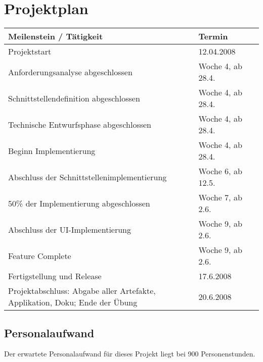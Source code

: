 

\section{Projektplan}
\begin{tabular}{ | p{11.2cm} | p{4cm} | l | }
\hline
\textbf{Meilenstein / Tätigkeit} & \textbf{Termin} \\
\hline
Projektstart & 12.04.2008\\
\hline
Anforderungsanalyse abgeschlossen & Woche 4, ab 28.4.\\
\hline
Schnittstellendefinition abgeschlossen  & Woche 4, ab 28.4.\\
\hline
Technische Entwurfsphase abgeschlossen & Woche 4, ab 28.4.\\
\hline
Beginn Implementierung & Woche 4, ab 28.4.\\
\hline
Abschluss der Schnittstellenimplementierung & Woche 6, ab 12.5.\\
\hline
50\% der Implementierung abgeschlossen & Woche 7, ab 2.6. \\
\hline 
Abschluss der UI-Implementierung & Woche 9, ab 2.6.\\
\hline
Feature Complete & Woche 9, ab 2.6.\\
\hline
Fertigstellung und Release & 17.6.2008 \\
\hline
Projektabschluss: Abgabe aller Artefakte, Applikation, Doku; Ende der Übung & 20.6.2008\\
\hline
\end{tabular}

\subsection{Personalaufwand}
Der erwartete Personalaufwand für dieses Projekt liegt bei 900 Personenstunden.

